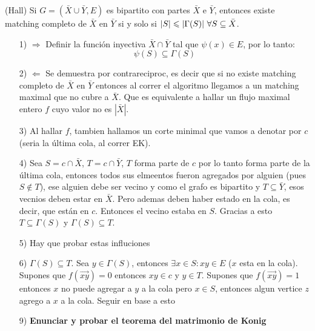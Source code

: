 \documentclass[12pt,a4paper]{article}
\begin{document}
\begin{teorema} (Hall) Si $G = (\bar{X} \cup \bar{Y}, E)$ es bipartito con partes 
    $\bar{X}$ e $\bar{Y}$, entonces existe matching completo de $\bar{X}$ en $\bar{Y}$
    si y solo si $|S| \leqslant |\Gamma(S)| \,\, \forall S \subseteq \bar{X}$.
\end{teorema}
\begin{itemize}
    \item [1)] $\Rightarrow$ Definir la función inyectiva  $\bar{X} \cap \bar{Y}$
        tal que $\psi(x) \in E$, por lo tanto: $$\psi(S) \subseteq \Gamma(S)$$
    \item [2)] $\Leftarrow$ Se demuestra por contrareciproc, es decir que si no 
        existe matching completo de $\bar{X}$ en $\bar{Y}$ entonces al correr el 
        algoritmo llegamos a un matching maximal que no cubre a $\bar{X}$. Que es 
        equivalente a hallar un flujo maximal entero $f$ cuyo valor no es $|\bar{X}|$.
    \item [3)] Al hallar $f$, tambien hallamos un corte minimal que vamos a denotar 
        por $c$ (seria la última cola, al correr EK).
    \item [4)] Sea $S = c\cap \bar{X}$, $T = c\cap \bar{Y}$, $T$ forma parte de $c$ 
        por lo tanto forma parte de la última cola, entonces todos sus elmeentos 
        fueron agregados por alguien (pues $S \notin T$), ese alguien debe ser vecino 
        y como el grafo es bipartito y $T \subseteq \bar{Y}$, esos vecnios deben 
        estar en $\bar{X}$. Pero ademas deben haber estado en la cola, es decir, 
        que están en $c$. Entonces el vecino estaba en $S$. Gracias a esto 
        $T \subseteq \Gamma(S)$ y $\Gamma(S) \subseteq T$. 
    \item [5)] Hay que probar estas influciones
    \item [6)] $\Gamma(S) \subseteq T$. Sea $y \in \Gamma(S)$, entonces 
        $\exists x \in S: xy \in E$ ($x$ esta en la cola).
        Supones que $f(\overrightarrow{xy}) = 0$ entonces $xy \in c$ y $y \in T$.
        Supones que $f(\overrightarrow{xy}) = 1$ entonces $x$ no puede agregar a $y$ 
        a la cola pero $x \in S$, entonces algun vertice $z$ agrego a $x$ a la cola.
        Seguir en base a esto
\end{itemize}

\begin{itemize}
    \item [9)] \textbf{Enunciar y probar el teorema del matrimonio de Konig}
    \label{dem:konig}
\end{itemize}
\end{document}
